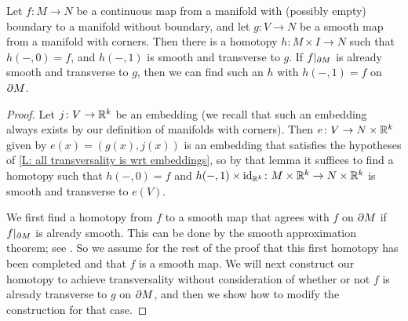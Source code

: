\begin{theorem}\label{T: basic trans}
	Let $f \colon M \to N$ be a continuous map from a manifold with (possibly empty) boundary to a manifold without boundary, and let $g \colon V \to N$ be a smooth map from a manifold with corners.
	Then there is a homotopy $h \colon M \times I \to N$ such that $h(-,0) = f$, and $h(-,1)$ is smooth and transverse to $g$.
	If $f|_{\partial M}$ is already smooth and transverse to $g$, then we can find such an $h$ with $h(-,1) = f$ on $\partial M$.
\end{theorem}

\begin{proof}
	Let $j \colon V \to \mathbb{R}^k$ be an embedding (we recall that such an embedding always exists by our definition of manifolds with corners).
	Then $e \colon V \to N \times \mathbb{R}^k$ given by $e(x) = (g(x),j(x))$ is an embedding that satisfies the hypotheses of \cref{L: all transversality is wrt embeddings}, so by that lemma it suffices to find a homotopy such that $h(-,0) = f$ and $h(-,1) \times \mathrm{id}_{\mathbb{R}^k} \colon M \times \mathbb{R}^k \to N \times \mathbb{R}^k$ is smooth and
	transverse to $e(V)$.

	We first find a homotopy from $f$ to a smooth map that agrees with $f$ on $\partial M$ if $f|_{\partial M}$ is already smooth.
	This can be done by the smooth approximation theorem; see \cite[Theorem III.2.5]{Kos93}.
	So we assume for the rest of the proof that this first homotopy has been completed and that $f$ is a smooth map.
	We will next construct our homotopy to achieve transversality without consideration of whether or not $f$ is already transverse to $g$ on $\partial M$, and then we show how to modify the construction for that case.


\end{proof}
